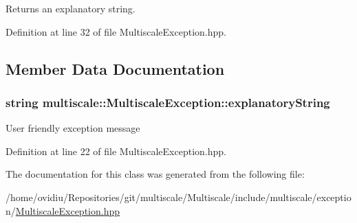 Returns an explanatory string. 



Definition at line 32 of file Multiscale\-Exception.\-hpp.



\subsection{Member Data Documentation}
\hypertarget{classmultiscale_1_1MultiscaleException_acf3042077605955cbb36a4472ed80233}{
\subsubsection[{explanatory\-String}]{\setlength{\rightskip}{0pt plus 5cm}string multiscale\-::\-Multiscale\-Exception\-::explanatory\-String\hspace{0.3cm}{\ttfamily [private]}}}\label{classmultiscale_1_1MultiscaleException_acf3042077605955cbb36a4472ed80233}
User friendly exception message 

Definition at line 22 of file Multiscale\-Exception.\-hpp.



The documentation for this class was generated from the following file\-:\begin{DoxyCompactItemize}
\item 
/home/ovidiu/\-Repositories/git/multiscale/\-Multiscale/include/multiscale/exception/\hyperlink{MultiscaleException_8hpp}{Multiscale\-Exception.\-hpp}\end{DoxyCompactItemize}
